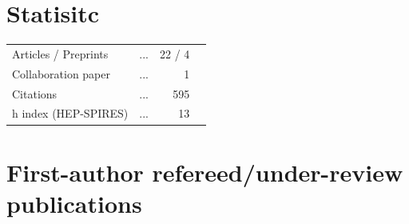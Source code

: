 \documentclass[10pt,floatfix,a4paper]{article}
\begin{document}
\section*{Statisitc}
\begin{tabular}{ l l r l}
	Articles / Preprints				& ... & 22 / 4 \\
	Collaboration paper			 		& ... & 1   \\
	Citations 							& ... & 595 \\
	h index (HEP-SPIRES) 				& ... & 13  \\
\end{tabular}

\section*{First-author refereed/under-review publications}
\end{document}
